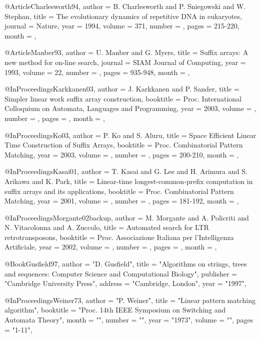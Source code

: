 @Article{Charlesworth94,
  author = 	 {B. Charlesworth and P. Sniegowski and W. Stephan},
  title = 	 {The evolutionary dynamics of repetitive {DNA} in eukaryotes},
  journal =  {Nature},
  year = 	 {1994},
  volume = 	 {371},
  number = 	 {},
  pages = 	 {215-220},
  month = 	 {},
}

@Article{Manber93,
  author = 	 {U. Manber and G. Myers},
  title = 	 {Suffix arrays: {A} new method for on-line search},
  journal =  {{SIAM} Journal of Computing},
  year = 	 {1993},
  volume = 	 {22},
  number = 	 {},
  pages = 	 {935-948},
  month = 	 {},
}

@InProceedings{Karkkanen03,
  author = 	 {J. Karkkanen and P. Sander},
  title = 	 {Simpler linear work suffix array construction},
  booktitle =  {Proc. International Colloquium on Automata, Languages and Programming},
  year = 	 {2003},
  volume = 	 {},
  number = 	 {},
  pages = 	 {},
  month = 	 {},
}


@InProceedings{Ko03,
  author = 	 {P. Ko and S. Aluru},
  title = 	 {Space Efficient Linear Time Construction of Suffix Arrays},
  booktitle =  {Proc. Combinatorial Pattern Matching},
  year = 	 {2003},
  volume = 	 {},
  number = 	 {},
  pages = 	 {200-210},
  month = 	 {},
}

@InProceedings{Kasai01,
  author = 	 {T. Kasai and G. Lee and H. Arimura and S. Arikawa and K. Park},
  title = 	 {Linear-time longest-common-prefix computation in suffix arrays and its applications},
  booktitle =  {Proc. Combinatorial Pattern Matching},
  year = 	 {2001},
  volume = 	 {},
  number = 	 {},
  pages = 	 {181-192},
  month = 	 {},
}

@InProceedings{Morgante02backup,
  author = 	 {M. Morgante and A. Policriti and N. Vitacolonna and A. Zuccolo},
  title = 	 {Automated search for {LTR} retrotransposons},
  booktitle =  {Proc. Associazione Italiana per l'Intelligenza Artificiale},
  year = 	 {2002},
  volume = 	 {},
  number = 	 {},
  pages = 	 {},
  month = 	 {},
}

@Book{Gusfield97,
  author =   "D. Gusfield",
  title =    "Algorithms on strings, trees and sequences: \uppercase{C}omputer
                  \uppercase{S}cience and \uppercase{C}omputational \uppercase{B}iology",
  publisher =    "Cambridge University Press",
  address   =    "Cambridge, London",
  year =     "1997",
}


@InProceedings{Weiner73,
   author =   "P. Weiner",
   title =   "Linear pattern matching algorithm",
   booktitle =   "Proc. 14th IEEE Symposium on Switching and Automata Theory",
   month = "",
   number = "",
   year =   "1973",
   volume =   "",
   pages =   "1-11",
}

